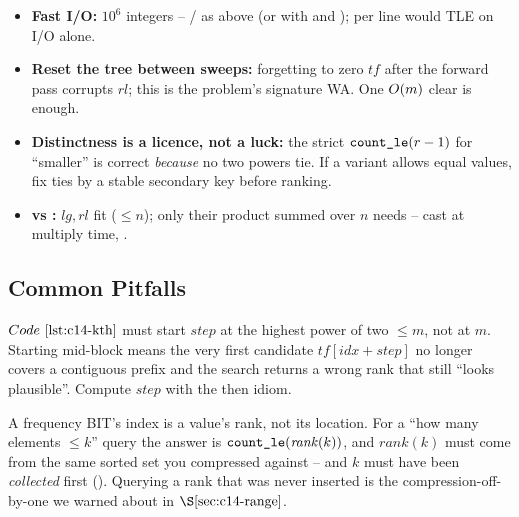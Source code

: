 \begin{hardeningbox}
\begin{itemize}[nosep,leftmargin=1.4em]
  \item \textbf{Fast I/O:} \(10^6\) integers -- / as
        above (or  with  and
        );  per line would TLE on I/O alone.
  \item \textbf{Reset the tree between sweeps:} forgetting to zero
        \(\mathit{tf}\) after the forward pass corrupts \(\mathit{rl}\); this
        is the problem's signature WA.  One \(O(m)\) clear is enough.
  \item \textbf{Distinctness is a licence, not a luck:} the strict
        \(\texttt{count\_le}(r-1)\) for ``smaller'' is correct \emph{because}
        no two powers tie.  If a variant allows equal values, fix ties by a
        stable secondary key before ranking.
  \item \textbf{ vs :} \(\mathit{lg},\mathit{rl}\)
        fit  (\(\le n\)); only their product summed over \(n\) needs
         -- cast at multiply time, .
\end{itemize}
\end{hardeningbox}

\subsection{Common Pitfalls}

\begin{warningbox}
\(\coderef{c14-kth}\) must start \(\mathit{step}\) at the highest power of
two \(\le m\), not at \(m\).  Starting mid-block means the very first
candidate \(\mathit{tf}[\mathit{idx}+\mathit{step}]\) no longer covers a
contiguous prefix and the search returns a wrong rank that still ``looks
plausible''.  Compute \(\mathit{step}\) with the  then  idiom.
\end{warningbox}

\begin{warningbox}
A frequency BIT's index is a value's rank, not its location.  For a ``how
many elements \(\le k\)'' query the answer is \(\texttt{count\_le}(\mathit{rank}(k))\),
and \(\mathit{rank}(k)\) must come from the same sorted set you compressed
against -- and \(k\) must have been \emph{collected} first
().  Querying a rank that was never inserted is the
compression-off-by-one we warned about in \(\secref{c14-range}\).
\end{warningbox}

